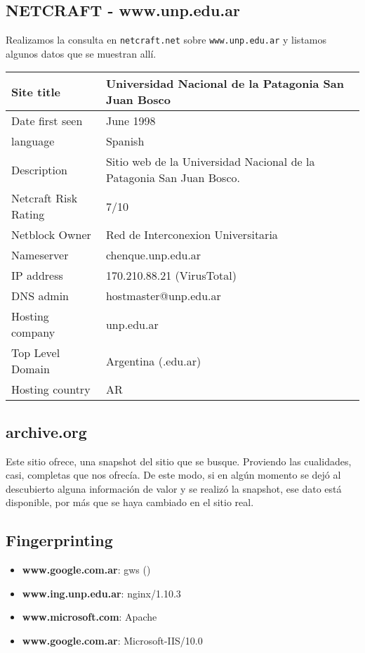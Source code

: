 \subsection*{NETCRAFT - www.unp.edu.ar}

Realizamos la consulta en \texttt{netcraft.net} sobre \texttt{www.unp.edu.ar} y listamos algunos datos que se muestran allí.

\begin{tabular}{l | l}
    \hline 
    Site title & Universidad Nacional de la Patagonia San Juan Bosco \\ \hline
    Date first seen & June 1998 \\ \hline
    language & Spanish \\ \hline
    Description & Sitio web de la Universidad Nacional de la Patagonia San Juan Bosco. \\ \hline
    Netcraft Risk Rating & 7/10 \\ \hline
    Netblock Owner & Red de Interconexion Universitaria \\ \hline
    Nameserver & chenque.unp.edu.ar \\ \hline
    IP address & 170.210.88.21 (VirusTotal) \\ \hline
    DNS admin & hostmaster@unp.edu.ar \\ \hline
    Hosting company & unp.edu.ar \\ \hline
    Top Level Domain & Argentina (.edu.ar) \\ \hline
    Hosting country & AR \\ \hline
    
\end{tabular}

\subsection*{archive.org}

Este sitio ofrece, una snapshot del sitio que se busque. Proviendo las cualidades, casi, completas que nos ofrecía. De este modo, si en algún momento se dejó al descubierto alguna información de valor y se realizó la snapshot, ese dato está disponible, por más que se haya cambiado en el sitio real.

\subsection*{Fingerprinting}

\begin{itemize}
    \item \textbf{www.google.com.ar}: gws ()
    \item \textbf{www.ing.unp.edu.ar}: nginx/1.10.3
    \item \textbf{www.microsoft.com}: Apache
    \item \textbf{www.google.com.ar}: Microsoft-IIS/10.0
\end{itemize}

